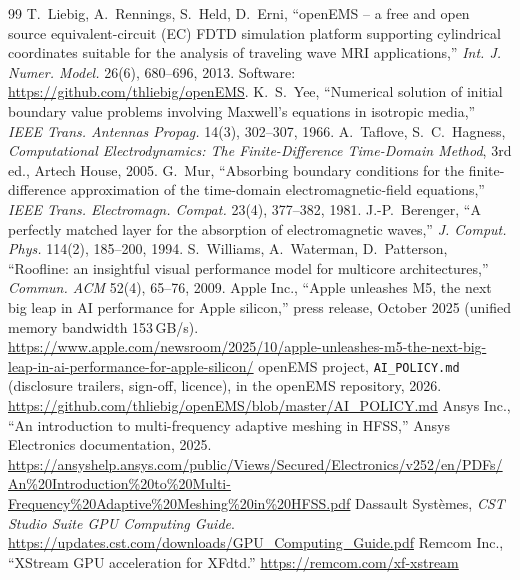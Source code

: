 \documentclass[10pt,a4paper]{article}
\newcommand{\code}[1]{\texttt{\small #1}}
\begin{document}















\begin{thebibliography}{99}\small
{} T.~Liebig, A.~Rennings, S.~Held, D.~Erni, ``openEMS -- a free and open source equivalent-circuit (EC) FDTD
  simulation platform supporting cylindrical coordinates suitable for the analysis of traveling wave MRI applications,''
  \emph{Int. J. Numer. Model.} 26(6), 680--696, 2013. Software: \url{https://github.com/thliebig/openEMS}.
 K.~S.~Yee, ``Numerical solution of initial boundary value problems involving Maxwell's equations in
  isotropic media,'' \emph{IEEE Trans. Antennas Propag.} 14(3), 302--307, 1966.
 A.~Taflove, S.~C.~Hagness, \emph{Computational Electrodynamics: The Finite-Difference Time-Domain Method},
  3rd ed., Artech House, 2005.
 G.~Mur, ``Absorbing boundary conditions for the finite-difference approximation of the time-domain
  electromagnetic-field equations,'' \emph{IEEE Trans. Electromagn. Compat.} 23(4), 377--382, 1981.
 J.-P.~Berenger, ``A perfectly matched layer for the absorption of electromagnetic waves,''
  \emph{J. Comput. Phys.} 114(2), 185--200, 1994.
 S.~Williams, A.~Waterman, D.~Patterson, ``Roofline: an insightful visual performance model for
  multicore architectures,'' \emph{Commun. ACM} 52(4), 65--76, 2009.
 Apple Inc., ``Apple unleashes M5, the next big leap in AI performance for Apple silicon,'' press release,
  October 2025 (unified memory bandwidth 153\,GB/s).
  \url{https://www.apple.com/newsroom/2025/10/apple-unleashes-m5-the-next-big-leap-in-ai-performance-for-apple-silicon/}
 openEMS project, \code{AI\_POLICY.md} (disclosure trailers, sign-off, licence), in the openEMS repository, 2026.
  \url{https://github.com/thliebig/openEMS/blob/master/AI_POLICY.md}
 Ansys Inc., ``An introduction to multi-frequency adaptive meshing in HFSS,'' Ansys Electronics
  documentation, 2025. \url{https://ansyshelp.ansys.com/public/Views/Secured/Electronics/v252/en/PDFs/An%20Introduction%20to%20Multi-Frequency%20Adaptive%20Meshing%20in%20HFSS.pdf}
 Dassault Syst\`emes, \emph{CST Studio Suite GPU Computing Guide}. \url{https://updates.cst.com/downloads/GPU_Computing_Guide.pdf}
 Remcom Inc., ``XStream GPU acceleration for XFdtd.'' \url{https://remcom.com/xf-xstream}

\end{thebibliography}
\end{document}
